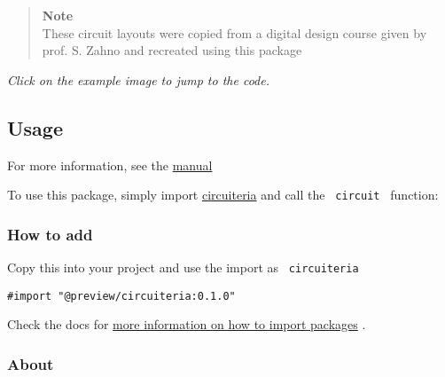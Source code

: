 \begin{quote}
\textbf{Note}\\
These circuit layouts were copied from a digital design course given by
prof. S. Zahno and recreated using this package
\end{quote}

\emph{Click on the example image to jump to the code.}

\subsection{Usage}\label{usage}

For more information, see the
\href{https://github.com/typst/packages/raw/main/packages/preview/circuiteria/0.1.0/manual.pdf}{manual}

To use this package, simply import
\href{https://typst.app/universe/package/circuiteria}{circuiteria} and
call the \texttt{\ circuit\ } function:

\begin{Shaded}
\begin{Highlighting}[]
\NormalTok{\})}
\end{Highlighting}
\end{Shaded}

\subsubsection{How to add}\label{how-to-add}

Copy this into your project and use the import as
\texttt{\ circuiteria\ }

\begin{verbatim}
#import "@preview/circuiteria:0.1.0"
\end{verbatim}



Check the docs for
\href{https://typst.app/docs/reference/scripting/\#packages}{more
information on how to import packages} .

\subsubsection{About}\label{about}

